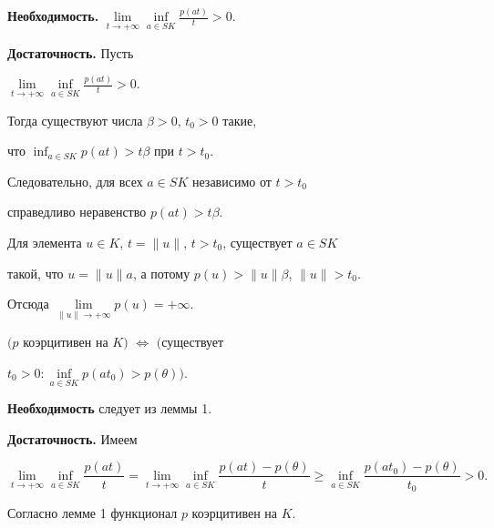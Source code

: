 \begin{pf} {\bf Необходимость.}
$\lim\limits_{t \to +\infty}\inf\limits_{a \in SK}


\frac{p(at)}{t}>0$.


\smallskip





{\bf Достаточность.} Пусть


$\lim\limits_{t \to +\infty}\inf\limits_{a \in SK}\frac {p(at)}{t}>0$.


Тогда существуют числа $\beta>0$, $t_0 > 0$ такие,


что $\inf_{a \in SK} p(at) > t\beta$ при $t>t_0$.


Следовательно, для всех $a \in SK$ независимо от $t>t_0$


справедливо неравенство $p(at) > t\beta$.


Для элемента $u \in K$, $t = \|u\|$, $t>t_0$, существует $a \in SK$


такой, что $u=\|u\|a$, а потому $p(u)>\|u\|\beta$, $\|u\|>t_0$. 


Отсюда $\lim\limits_{\|u\| \to +\infty} p(u)=+\infty$.


\end{pf} 





\begin {lem}


$(p$ коэрцитивен на $K)$ $\Longleftrightarrow$ $($существует


$t_0>0 :\inf\limits_{a \in SK} p(at_0) > p(\theta))$.


\end{lem}





\begin{pf} {\bf Необходимость} следует из леммы 1.





{\bf Достаточность.} Имеем


$$


\lim_{t \to +\infty}\inf_{a \in SK}\frac {p(at)} {t} =


\lim_{t \to +\infty}\inf_{a \in SK}\frac {p(at)-p(\theta)}{ t} \ge


\inf_{a \in SK}\frac {p(at_0)-p(\theta )}{ t_0}> 0.


$$


Согласно лемме 1 функционал $p$ коэрцитивен на $K$.


\end{pf}





